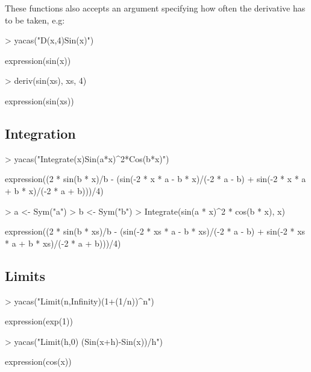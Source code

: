 \documentclass[]{article}
\begin{document}
These functions also accepts an argument specifying how often the
derivative has to be taken, e.g:
\begin{Schunk}
\begin{Sinput}
> yacas("D(x,4)Sin(x)")
\end{Sinput}
\begin{Soutput}
expression(sin(x))
\end{Soutput}
\end{Schunk}

\begin{Schunk}
\begin{Sinput}
> deriv(sin(xs), xs, 4)
\end{Sinput}
\begin{Soutput}
expression(sin(xs))
\end{Soutput}
\end{Schunk}

\subsection{Integration}


\begin{Schunk}
\begin{Sinput}
> yacas("Integrate(x)Sin(a*x)^2*Cos(b*x)")
\end{Sinput}
\begin{Soutput}
expression((2 * sin(b * x)/b - (sin(-2 * x * a - b * x)/(-2 * 
    a - b) + sin(-2 * x * a + b * x)/(-2 * a + b)))/4)
\end{Soutput}
\end{Schunk}

\begin{Schunk}
\begin{Sinput}
> a <- Sym("a")
> b <- Sym("b")
> Integrate(sin(a * x)^2 * cos(b * x), x)
\end{Sinput}
\begin{Soutput}
expression((2 * sin(b * xs)/b - (sin(-2 * xs * a - b * xs)/(-2 * 
    a - b) + sin(-2 * xs * a + b * xs)/(-2 * a + b)))/4)
\end{Soutput}
\end{Schunk}


\subsection{Limits}
\begin{Schunk}
\begin{Sinput}
> yacas("Limit(n,Infinity)(1+(1/n))^n")
\end{Sinput}
\begin{Soutput}
expression(exp(1))
\end{Soutput}
\begin{Sinput}
> yacas("Limit(h,0) (Sin(x+h)-Sin(x))/h")
\end{Sinput}
\begin{Soutput}
expression(cos(x))
\end{Soutput}
\end{Schunk}
\end{document}
